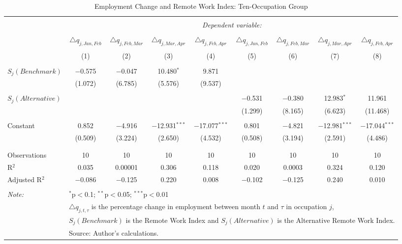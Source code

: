
\begin{table}[!htbp] \centering 
  \caption{Employment Change and Remote Work Index: Ten-Occupation Group} 
  \label{tab:regression_dynamics_10oc} 
\footnotesize 
\begin{tabular}{@{\extracolsep{5pt}}lcccccccc} 
\\[-1.8ex]\hline 
\hline \\[-1.8ex] 
 & \multicolumn{8}{c}{\textit{Dependent variable:}} \\ 
\cline{2-9} 
\\[-1.8ex] & $\triangle q_{j,Jan,Feb}$ & $\triangle q_{j,Feb,Mar}$ & $\triangle q_{j,Mar,Apr}$ & $\triangle q_{j,Feb,Apr}$ & $\triangle q_{j,Jan,Feb}$ & $\triangle q_{j,Feb,Mar}$ & $\triangle q_{j,Mar,Apr}$ & $\triangle q_{j,Feb,Apr}$ \\ 
\\[-1.8ex] & (1) & (2) & (3) & (4) & (5) & (6) & (7) & (8)\\ 
\hline \\[-1.8ex] 
 $S_{j}(Benchmark)$ & $-$0.575 & $-$0.047 & 10.480$^{*}$ & 9.871 &  &  &  &  \\ 
  & (1.072) & (6.785) & (5.576) & (9.537) &  &  &  &  \\ 
  & & & & & & & & \\ 
 $S_{j}(Alternative)$ &  &  &  &  & $-$0.531 & $-$0.380 & 12.983$^{*}$ & 11.961 \\ 
  &  &  &  &  & (1.299) & (8.165) & (6.623) & (11.468) \\ 
  & & & & & & & & \\ 
 Constant & 0.852 & $-$4.916 & $-$12.931$^{***}$ & $-$17.077$^{***}$ & 0.801 & $-$4.821 & $-$12.981$^{***}$ & $-$17.044$^{***}$ \\ 
  & (0.509) & (3.224) & (2.650) & (4.532) & (0.508) & (3.194) & (2.591) & (4.486) \\ 
  & & & & & & & & \\ 
\hline \\[-1.8ex] 
Observations & 10 & 10 & 10 & 10 & 10 & 10 & 10 & 10 \\ 
R$^{2}$ & 0.035 & 0.00001 & 0.306 & 0.118 & 0.020 & 0.0003 & 0.324 & 0.120 \\ 
Adjusted R$^{2}$ & $-$0.086 & $-$0.125 & 0.220 & 0.008 & $-$0.102 & $-$0.125 & 0.240 & 0.010 \\ 
\hline 
\hline \\[-1.8ex] 
\textit{Note:}  & \multicolumn{8}{l}{$^{*}$p$<$0.1; $^{**}$p$<$0.05; $^{***}$p$<$0.01} \\ 
 & \multicolumn{8}{l}{$\triangle q_{j,t,\tau}$ is the percentage change in employment between month $t$ and $\tau$ in occupation $j$,} \\ 
 & \multicolumn{8}{l}{$S_{j} (Benchmark)$ is the Remote Work Index and $S_{j} (Alternative)$ is the Alternative Remote Work Index.} \\ 
 & \multicolumn{8}{l}{Source: Author's calculations.} \\ 
\end{tabular} 
\end{table} 
